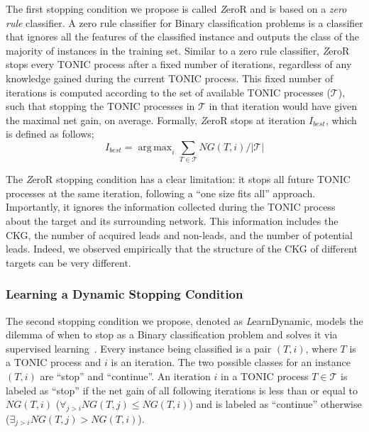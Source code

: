 \documentclass[journal]{IEEEtran}
\DeclareMathOperator*{\argmax}{arg\,max}
\newcommand{\learnFixed}{{\textit ZeroR}}
\newcommand{\learnDynamic}{{\textit LearnDynamic}}
\begin{document}
The first stopping condition we propose is called \learnFixed{} and is based on a \emph{zero rule} classifier. A zero rule classifier for Binary classification problems is a classifier that ignores all the features of the classified instance and outputs the class of the majority of instances in the training set. Similar to a zero rule classifier, \learnFixed{} stops every TONIC process after a fixed number of iterations, regardless of any knowledge gained during the current TONIC process. 
This fixed number of iterations is computed according to the set of available TONIC processes ($\mathcal{T}$), such that stopping the TONIC processes in $\mathcal{T}$ in that iteration would have given the maximal net gain, on average. Formally, \learnFixed{} stops at iteration $I_{best}$, which is defined as follows; 
\begin{equation}
I_{best} = \argmax_i \sum_{T\in\mathcal{T}} NG(T,i)/|\mathcal{T}| \label{eq:ibest}
\end{equation}


The \learnFixed{} stopping condition has a clear limitation: it stops all future TONIC processes at the same iteration, following a ``one size fits all'' approach. 
Importantly, it ignores the information collected during the TONIC process about the target and its surrounding network. 
This information includes the CKG, the number of acquired leads and non-leads, and the number of potential leads. Indeed, we observed empirically that the structure of the CKG of different targets can be very different. 

\subsubsection{Learning a Dynamic Stopping Condition}
The second stopping condition we propose, denoted as 
\learnDynamic{}, models 
the dilemma of when to stop as a Binary classification problem and solves it via supervised learning~\cite{mitchell1997machineLearning}. 
Every instance being classified is a pair $(T,i)$, where $T$ is a TONIC process and $i$ is an iteration. 
The two possible classes for an instance $(T,i)$ are ``stop'' and ``continue''. 
An iteration $i$ in a TONIC process $T\in\mathcal{T}$ is labeled as ``stop'' if the net gain of all following iterations is less than or equal to $NG(T,i)$ (\(\forall_{j>i} NG(T,j)\leq NG(T,i)\)) and is labeled as ``continue'' otherwise (\(\exists_{j>i} NG(T,j)>NG(T,i)\)).
\end{document}
